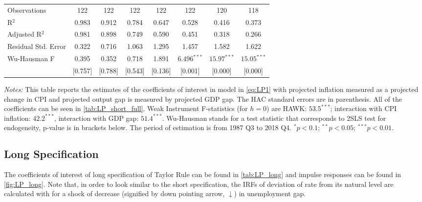 \documentclass[11pt]{article}
\begin{document}
\begin{table}[!hbtp]
\begin{threeparttable}
\begin{tabular}{@{\extracolsep{5pt}}lccccccc}
       Observations & 122 & 122 & 122 & 122 & 122 & 120 & 118 \\ 
       R$^{2}$ & 0.983 & 0.912 & 0.784 & 0.647 & 0.528 & 0.416 & 0.373 \\ 
       Adjusted R$^{2}$ & 0.981 & 0.898 & 0.749 & 0.590 & 0.451 & 0.318 & 0.266 \\ 
       Residual Std. Error & 0.322 & 0.716 & 1.063 & 1.295 & 1.457 & 1.582 & 1.622 \\ 
       Wu-Hausman F & 0.395& 0.352& 0.718& 1.891& $6.496^{***}$ &$15.97^{***}$& $15.05^{***}$ \\ 
       & [0.757] & [0.788]& [0.543] & [0.136] &[0.001] & [0.000] & [0.000]\\ \hline 
       \hline 
    \end{tabular}
    \begin{tablenotes}[flushleft]\scriptsize
      \item \textit{Notes:} 
      This table reports the estimates of the coefficients of interest in model in \vref{eq:LP1} with projected inflation measured as a projected change in CPI and projected output gap is measured by projected GDP gap.
      The \citet{Andrews1991} HAC standard errors are in parenthesis. 
      All of the coefficients can be seen in \vref{tab:LP_short_full}. 
      Weak Instrument F-statistics (for $h=0$) are HAWK: $53.5^{***}$; interaction with CPI inflation: $42.2^{***}$, interaction with GDP gap: $51.4^{***}$. Wu-Hausman stands for a test statistic that corresponds to 2SLS test for endogeneity, p-value is in brackets below.  The period of estimation is from 1987 Q3 to 2018 Q4. $^{*}p<0.1$; $^{**}p<0.05$; $^{***}p<0.01$.
    \end{tablenotes}
    \end{threeparttable}  
    \end{table}
  
  





  \subsection{Long Specification}

  The coefficients of interest of long specification of Taylor Rule can be found in \vref{tab:LP_long} and impulse responses can be found in \vref{fig:LP_long}. 
  Note that, in order to look similar to the short specification, the IRFs of deviation of rate from its natural level are calculated with for a shock of decrease (signified by down pointing arrow, $\downarrow$) in unemployment gap.
\end{document}
